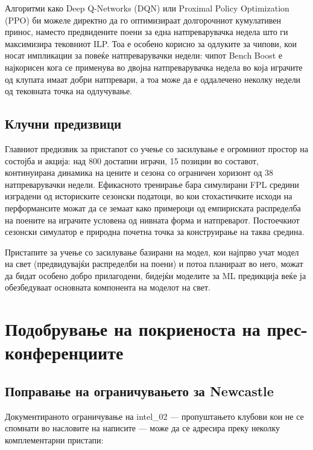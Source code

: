 Алгоритми како Deep Q-Networks (DQN) или Proximal Policy Optimization (PPO) би можеле директно да го оптимизираат долгорочниот кумулативен принос, наместо предвидените поени за една натпреварувачка недела што ги максимизира тековниот ILP. Тоа е особено корисно за одлуките за чипови, кои носат импликации за повеќе натпреварувачки недели: чипот Bench Boost е најкорисен кога се применува во двојна натпреварувачка недела во која играчите од клупата имаат добри натпревари, а тоа може да е оддалечено неколку недели од тековната точка на одлучување.

\subsection{Клучни предизвици}

Главниот предизвик за пристапот со учење со засилување е огромниот простор на состојба и акција: над 800 достапни играчи, 15 позиции во составот, континуирана динамика на цените и сезона со ограничен хоризонт од 38 натпреварувачки недели. Ефикасното тренирање бара симулирани FPL средини изградени од историските сезонски податоци, во кои стохастичките исходи на перформансите можат да се земаат како примероци од емпириската распределба на поените на играчите условена од нивната форма и натпреварот. Постоечкиот сезонски симулатор е природна почетна точка за конструирање на таква средина.

Пристапите за учење со засилување базирани на модел, кои најпрво учат модел на свет (предвидувајќи распределби на поени) и потоа планираат во него, можат да бидат особено добро прилагодени, бидејќи моделите за ML предикција веќе ја обезбедуваат основната компонента на моделот на свет.

\section{Подобрување на покриеноста на прес-конференциите}

\subsection{Поправање на ограничувањето за Newcastle}

Документираното ограничување на intel\_02 — пропуштањето клубови кои не се спомнати во насловите на написите — може да се адресира преку неколку комплементарни пристапи:

